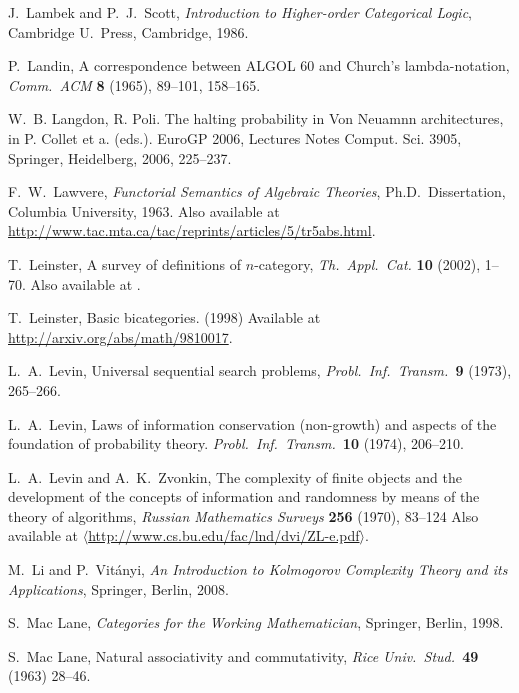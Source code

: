 \documentclass[12pt,twoside,openright]{report}
\begin{document}
\begin{thebibliography}{99}
 J.\ Lambek and P.\ J.\ Scott, {\sl Introduction to Higher-order Categorical Logic}, Cambridge U.\ Press, Cambridge,
1986.  

 P.\ Landin, A correspondence between ALGOL 60 and Church's lambda-notation, {\sl Comm.\ ACM} {\bf 8} (1965), 89--101,
158--165.

 W.~B. Langdon, R. Poli. The halting probability in Von Neuamnn architectures, in P. Collet et a. (eds.). EuroGP 2006, Lectures Notes Comput. Sci. 3905, Springer, Heidelberg, 2006, 225--237.

 F.\ W.\ Lawvere, {\sl Functorial Semantics of Algebraic Theories}, Ph.D.\ Dissertation, Columbia University, 1963. Also available at 
\href{http://www.tac.mta.ca/tac/reprints/articles/5/tr5abs.html}
{http://www.tac.mta.ca/tac/reprints/articles/5/tr5abs.html}.

T.\ Leinster, A survey of definitions of $n$-category,
\textsl{Th.\ Appl.\ Cat.} \textbf{10} (2002), 1--70. Also available at .

 T.\ Leinster, Basic bicategories. (1998)  Available at \href{http://arxiv.org/abs/math/9810017}{http://arxiv.org/abs/math/9810017}.

 L.\ A.\ Levin, Universal sequential search problems, \textit{Probl.\ Inf.\ Transm.\ }\textbf{9}
(1973), 265--266.

 L.\ A.\ Levin, Laws of information conservation
(non-growth) and aspects of the foundation of probability theory.
\textit{Probl.\ Inf.\ Transm.\ }\textbf{10} (1974),
206--210.

 L.\ A.\ Levin and A.\ K.\ Zvonkin, The complexity of finite objects and the development of the concepts of information and randomness by means of the theory of algorithms, 
\textsl{Russian Mathematics Surveys} {\bf 256} (1970), 83--124
Also available at \href{http://www.cs.bu.edu/fac/lnd/dvi/ZL-e.pdf}
{$\langle$http://www.cs.bu.edu/fac/lnd/dvi/ZL-e.pdf$\rangle$}.

 M.\ Li and P.\ Vit\'anyi, \textsl{An Introduction to Kolmogorov Complexity Theory and its Applications}, Springer, Berlin, 2008.

 S.\ Mac Lane, {\sl Categories for the Working Mathematician}, Springer, Berlin, 1998.

 S.\ Mac Lane, Natural associativity and commutativity, {\sl Rice Univ.\ Stud.\ }{\bf 49} (1963) 28--46.


\end{thebibliography}
\end{document}
